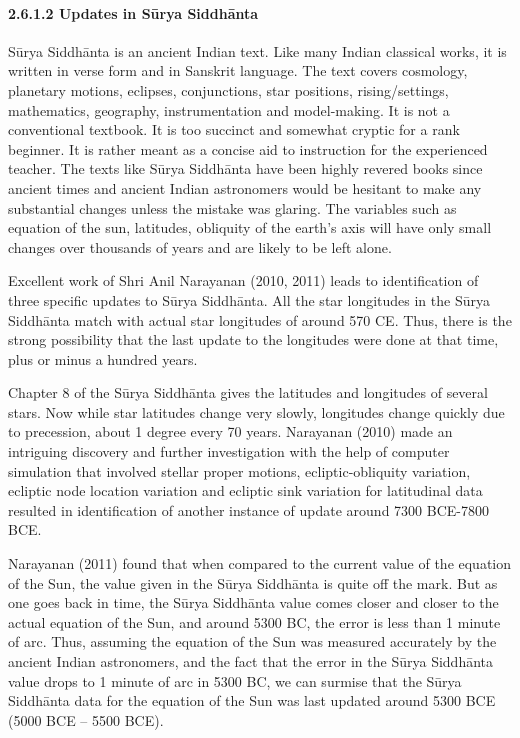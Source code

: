 \paragraph{2.6.1.2 Updates in Sūrya Siddhānta}

Sūrya Siddhānta is an ancient Indian text. Like many Indian classical works, it is written in verse form and in Sanskrit language. The text covers cosmology, planetary motions, eclipses, conjunctions, star positions, rising/settings, mathematics, geography, instrumentation and model-making. It is not a conventional textbook. It is too succinct and somewhat cryptic for a rank beginner. It is rather meant as a concise aid to instruction for the experienced teacher. The texts like Sūrya Siddhānta have been highly revered books since ancient times and ancient Indian astronomers would be hesitant to make any substantial changes unless the mistake was glaring. The variables such as equation of the sun, latitudes, obliquity of the earth's axis will have only small changes over thousands of years and are likely to be left alone.

Excellent work of Shri Anil Narayanan (2010, 2011) leads to identification of three specific updates to Sūrya Siddhānta. All the star longitudes in the Sūrya Siddhānta match with actual star longitudes of around 570 CE. Thus, there is the strong possibility that the last update to the longitudes were done at that time, plus or minus a hundred years.

Chapter 8 of the Sūrya Siddhānta gives the latitudes and longitudes of several stars. Now while star latitudes change very slowly, longitudes change quickly due to precession, about 1 degree every 70 years. Narayanan (2010) made an intriguing discovery and further investigation with the help of computer simulation that involved stellar proper motions, ecliptic-obliquity variation, ecliptic node location variation and ecliptic sink variation for latitudinal data resulted in identification of another instance of update around 7300 BCE-7800 BCE.

Narayanan (2011) found that when compared to the current value of the equation of the Sun, the value given in the Sūrya Siddhānta is quite off the mark. But as one goes back in time, the Sūrya Siddhānta value comes closer and closer to the actual equation of the Sun, and around 5300 BC, the error is less than 1 minute of arc. Thus, assuming the equation of the Sun was measured accurately by the ancient Indian astronomers, and the fact that the error in the Sūrya Siddhānta value drops to 1 minute of arc in 5300 BC, we can surmise that the Sūrya Siddhānta data for the equation of the Sun was last updated around 5300 BCE (5000 BCE – 5500 BCE).

